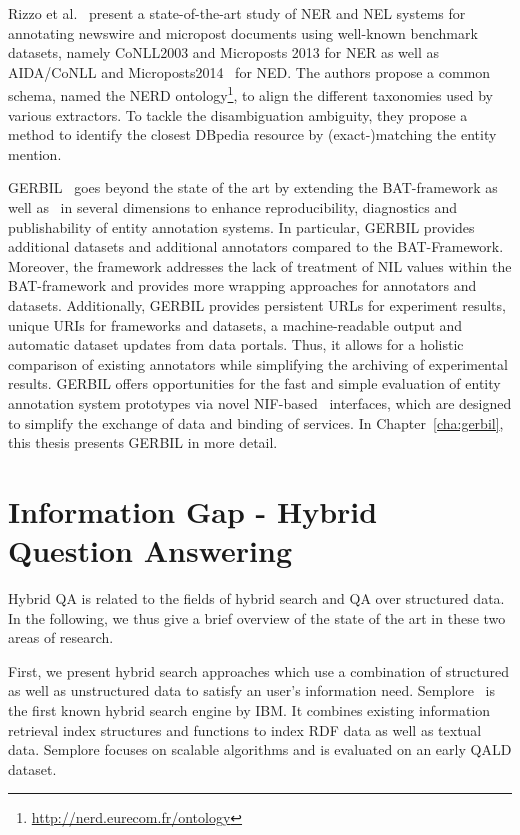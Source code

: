 Rizzo et al.~\cite{rizzo2014}  present a state-of-the-art study of NER and NEL systems for annotating newswire and micropost documents using well-known benchmark datasets, namely CoNLL2003 and Microposts 2013 for NER as well as AIDA/CoNLL and Microposts2014~\cite{Cano2014} for NED. 
The authors propose a common schema, named the NERD ontology\footnote{\url{http://nerd.eurecom.fr/ontology}}, to align the different taxonomies used by various extractors. To tackle the disambiguation ambiguity, they propose a method to identify the closest DBpedia resource by (exact-)matching the entity mention.

GERBIL~\cite{GERBIL} goes beyond the state of the art by extending the BAT-framework as well as~\cite{rizzo2014} in several dimensions to enhance reproducibility, diagnostics and publishability of entity annotation systems. 
In particular, GERBIL provides \numberOfadditionalDatasets additional datasets and \numberOfadditionalAnnotators additional annotators compared to the BAT-Framework. 
Moreover, the framework addresses the lack of treatment of NIL values within the BAT-framework and provides more wrapping approaches for annotators and datasets. 
Additionally, GERBIL provides persistent URLs for experiment results, unique URIs for frameworks and datasets, a machine-readable output and automatic dataset updates from data portals. 
Thus, it allows for a holistic comparison of existing annotators while simplifying the archiving of experimental results. 
GERBIL offers opportunities for the fast and simple evaluation of entity annotation system prototypes via novel NIF-based~\cite{NIF} interfaces, which are designed to simplify the exchange of data and binding of services.
In Chapter~\ref{cha:gerbil}, this thesis presents GERBIL in more detail.

\section{Information Gap - Hybrid Question Answering}

Hybrid \ac{QA} is related to the fields of hybrid search and \ac{QA} over structured data. 
In the following, we thus give a brief overview of the state of the art in these two areas of research.

First, we present hybrid search approaches which use a combination of structured as well as unstructured data to satisfy an user's information need. 
Semplore~\cite{Zhang:2007a} is the first known hybrid search engine by IBM.
It combines existing information retrieval index structures and functions to index \ac{RDF} data as well as textual data. 
Semplore focuses on scalable algorithms and is evaluated on an early \ac{QALD} dataset.

